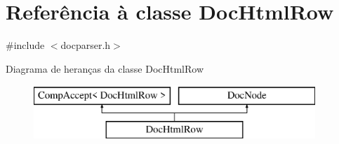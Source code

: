 \hypertarget{class_doc_html_row}{\section{Referência à classe Doc\-Html\-Row}
\label{class_doc_html_row}
}


{\ttfamily \#include $<$docparser.\-h$>$}

Diagrama de heranças da classe Doc\-Html\-Row\begin{figure}[H]
\begin{center}
\leavevmode
\includegraphics[height=2.000000cm]{class_doc_html_row}
\end{center}
\end{figure}

